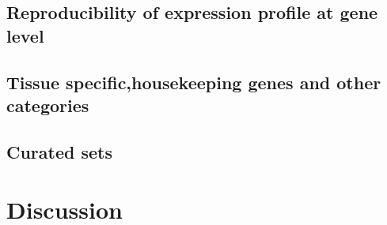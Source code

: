     \subsection{Reproducibility of expression profile at gene level}\label{subsec:Trans_ReproExpresGene}

    \subsection{Tissue specific,housekeeping genes and other categories}\label{subsec:Trans_TissueSpeAndHK}

    \subsection{Curated sets}\label{subsec:Trans_curatedSets}

\section{Discussion}\label{sec:Trans_discussion}



\begin{comment}
  \begin{figure}%
      \includegraphics%
      {transcriptomics/}\centering
      \caption[]
      {\label{fig:}\textbf{}}
  \end{figure}
\end{comment}
